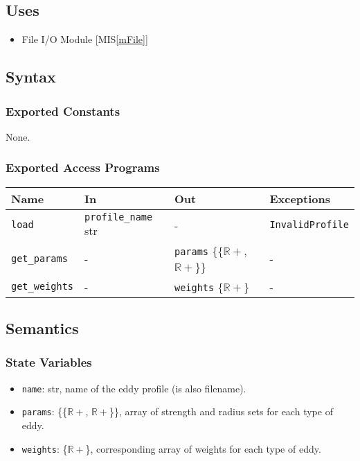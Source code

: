 \documentclass[12pt, titlepage]{article}
\begin{document}
\subsection{Uses}
\begin{itemize}
\item File I/O Module [MIS\ref{mFile}]
\end{itemize}

\subsection{Syntax}

\subsubsection{Exported Constants}
None.

\subsubsection{Exported Access Programs}

\begin{center}
\begin{tabular}{p{2.5cm} p{3.5cm} p{5cm} p{4cm}}
\hline
\textbf{Name} & \textbf{In} & \textbf{Out} & \textbf{Exceptions} \\
\hline
\texttt{load} & \texttt{profile\_name} str & - & \texttt{InvalidProfile} \\
\texttt{get\_params}& - & \texttt{params} \{{\{$\mathbb{R+}$, $\mathbb{R+}$\}}\} & - \\
\texttt{get\_weights}& - & \texttt{weights} \{$\mathbb{R+}$\} & - \\
\hline
\end{tabular}
\end{center}

\subsection{Semantics}

\subsubsection{State Variables}
\begin{itemize}
  \item \texttt{name}: str, name of the eddy profile (is also filename).
  \item \texttt{params}: \{{\{$\mathbb{R+}$, $\mathbb{R+}$\}}\}, array of strength and radius sets for each type of eddy.
  \item \texttt{weights}: \{$\mathbb{R+}$\}, corresponding array of weights for each type of eddy.
\end{itemize}
\end{document}
